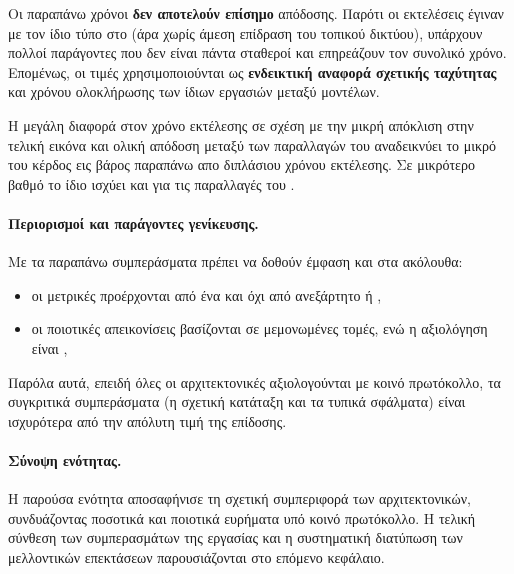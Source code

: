 Οι παραπάνω χρόνοι \textbf{δεν αποτελούν επίσημο } απόδοσης.
Παρότι οι εκτελέσεις έγιναν με τον ίδιο τύπο  στο  (άρα χωρίς
άμεση επίδραση του τοπικού δικτύου), υπάρχουν πολλοί παράγοντες που δεν είναι
πάντα σταθεροί και επηρεάζουν τον συνολικό χρόνο. Επομένως, οι τιμές χρησιμοποιούνται ως
\textbf{ενδεικτική αναφορά σχετικής ταχύτητας} και χρόνου ολοκλήρωσης των ίδιων
εργασιών μεταξύ μοντέλων.

Η μεγάλη διαφορά στον χρόνο εκτέλεσης σε σχέση με την μικρή απόκλιση στην τελική εικόνα και ολική 
απόδοση μεταξύ των παραλλαγών του  αναδεικνύει 
το μικρό του κέρδος εις βάρος παραπάνω απο διπλάσιου χρόνου εκτέλεσης. 
Σε μικρότερο βαθμό το ίδιο ισχύει και για τις παραλλαγές του .


\paragraph{Περιορισμοί και παράγοντες γενίκευσης.}
Με τα παραπάνω συμπεράσματα πρέπει να δοθούν έμφαση και στα ακόλουθα: 
\begin{itemize}
  \item οι μετρικές προέρχονται από ένα  και όχι από ανεξάρτητο  ή ,
  \item οι ποιοτικές απεικονίσεις βασίζονται σε μεμονωμένες  τομές, ενώ η αξιολόγηση είναι , 
\end{itemize}
Παρόλα αυτά, επειδή όλες οι αρχιτεκτονικές αξιολογούνται με κοινό πρωτόκολλο,
τα συγκριτικά συμπεράσματα (η σχετική κατάταξη και τα τυπικά σφάλματα) είναι
ισχυρότερα από την απόλυτη τιμή της επίδοσης.

\paragraph{Σύνοψη ενότητας.}
Η παρούσα ενότητα αποσαφήνισε τη σχετική συμπεριφορά των αρχιτεκτονικών,
συνδυάζοντας ποσοτικά και ποιοτικά ευρήματα υπό κοινό πρωτόκολλο. Η τελική
σύνθεση των συμπερασμάτων της εργασίας και η συστηματική διατύπωση των
μελλοντικών επεκτάσεων παρουσιάζονται στο επόμενο κεφάλαιο.
